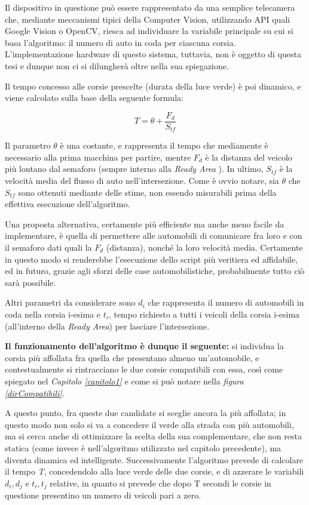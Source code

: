 Il dispositivo in questione può essere rappresentato da una semplice telecamera che, mediante meccanismi tipici della Computer Vision, utilizzando API quali Google Vision\cite{google_vision} o OpenCV\cite{open_CV}, riesca ad individuare la variabile principale su cui si basa l’algoritmo: il numero di auto in coda per ciascuna corsia. L’implementazione hardware di questo sistema, tuttavia, non è oggetto di questa tesi e dunque non ci si dilungherà oltre nella sua spiegazione.

Il tempo concesso alle corsie prescelte (durata della luce verde) è poi dinamico, e viene calcolato sulla base della seguente formula: 

\begin{equation} \label{eq:}
  T = \theta + \frac{F_d}{S_{tf}}
\end{equation}

Il parametro $\theta$ è una costante, e rappresenta il tempo che mediamente è necessario alla prima macchina per partire, mentre $F_d$ è la distanza del veicolo più lontano dal semaforo (sempre interno alla \textit{Ready Area} ). In ultimo, $S_{tf}$ è la velocità media del flusso di auto nell’intersezione. Come è ovvio notare, sia $\theta$ che $S_{tf}$ sono ottenuti mediante delle stime, non essendo misurabili prima della effettiva esecuzione dell’algoritmo. 

Una proposta alternativa, certamente più efficiente ma anche meno facile da implementare, è quella di permettere alle automobili di comunicare fra loro e con il semaforo dati quali la $F_d$ (distanza), nonché la loro velocità media. Certamente in questo modo si renderebbe l’esecuzione dello script più veritiera ed affidabile, ed in futuro, grazie agli sforzi delle case automobilistiche, probabilmente tutto ciò sarà possibile.

Altri parametri da considerare sono $d_i$ che rappresenta il numero di automobili in coda nella corsia i-esima e $t_i$, tempo richiesto a tutti i veicoli della corsia i-esima (all’interno della \textit{Ready Area}) per lasciare l’intersezione.

\textbf{Il funzionamento dell’algoritmo è dunque il seguente:} si individua la corsia più affollata fra quella che presentano almeno un’automobile, e contestualmente si rintracciano le due corsie compatibili con essa, così come spiegato nel \textit{Capitolo \ref{capitolo1}} e come si può notare nella \textit{figura \ref{dirCompatibili}}.

A questo punto, fra queste due candidate si sceglie ancora la più affollata; in questo modo non solo si va a concedere il verde alla strada con più automobili, ma si cerca anche di ottimizzare la scelta della sua complementare, che non resta statica (come invece è nell’algoritmo utilizzato nel capitolo precedente), ma diventa dinamica ed intelligente. Successivamente l’algoritmo prevede di calcolare il tempo \textit{T}, concedendolo alla luce verde delle due corsie, e di azzerare le variabili $d_i, d_j$ e $t_i, t_j$ relative, in quanto si prevede che dopo T secondi le corsie in questione presentino un numero di veicoli pari a zero.
\newpage
